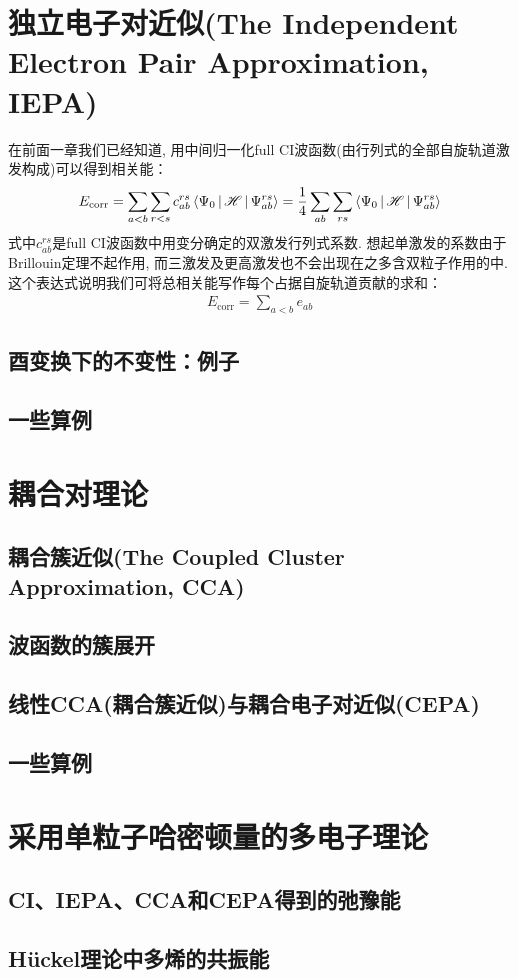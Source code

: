 \section{独立电子对近似(The Independent Electron Pair Approximation, IEPA)}
在前面一章我们已经知道, 用中间归一化full CI波函数(由\hft 行列式的全部自旋轨道激发构成)可以得到相关能：
\begin{align}
E_\mathrm{corr} = \sum_{a<b}\sum_{r<s}c_{ab}^{rs}\Braket{\Psi_0|\mathscr{H}|\Psi_{ab}^{rs}} = \frac{1}{4}\sum_{ab}\sum_{rs}\Braket{\Psi_0|\mathscr{H}|\Psi_{ab}^{rs}}
\end{align}
式中$c_{ab}^{rs}$是full CI波函数中用变分确定的双激发行列式系数. 想起单激发的系数由于Brillouin定理不起作用, 而三激发及更高激发也不会出现在之多含双粒子作用的\ha 中. 这个表达式说明我们可将总相关能写作每个占据自旋轨道贡献的求和：
\begin{align}
E_\mathrm{corr} = \sum_{a<b}e_{ab}
\end{align}
\subsection{酉变换下的不变性：例子}
\subsection{一些算例}

\section{耦合对理论}
\subsection{耦合簇近似(The Coupled Cluster Approximation, CCA)}
\subsection{波函数的簇展开}
\subsection{线性CCA(耦合簇近似)与耦合电子对近似(CEPA)}
\subsection{一些算例}

\section{采用单粒子哈密顿量的多电子理论}
\subsection{CI、IEPA、CCA和CEPA得到的弛豫能}
\subsection{H\"uckel理论中多烯的共振能}